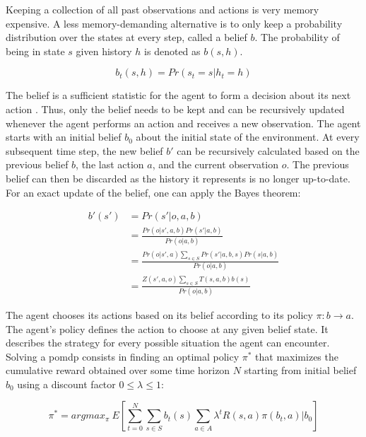 Keeping a collection of all past observations and actions is very memory expensive. A less memory-demanding alternative is to only keep a probability distribution over the states at every step, called a belief $b$. The probability of being in state $s$ given history $h$ is denoted as $b(s,h)$. 

\begin{equation}
    b_t(s,h) = Pr(s_t = s|h_t = h)
\end{equation}

The belief is a sufficient statistic for the agent to form a decision about its next action \parencite{pomdp-belief}. Thus, only the belief needs to be kept and can be recursively updated whenever the agent performs an action and receives a new observation. The agent starts with an initial belief $b_0$ about the initial state of the environment. At every subsequent time step, the new belief $b'$ can be recursively calculated based on the previous belief $b$, the last action $a$, and the current observation $o$. The previous belief can then be discarded as the history it represents is no longer up-to-date. For an exact update of the belief, one can apply the Bayes theorem:

\begin{equation}
    \label{eq:bayes_update}
    \begin{split}
        b'(s') & = Pr(s' | o, a , b) \\
               & = \frac{Pr(o | s', a, b)Pr(s' | a,b)}{Pr(o| a, b)} \\
               & = \frac{Pr(o | s', a)\sum_{s \in S}Pr(s' | a, b, s)Pr(s| a, b)}{Pr(o| a, b)} \\
               & = \frac{Z(s', a, o)\sum_{s \in S}T(s, a, b)b(s)}{Pr(o | a, b)}
    \end{split}
\end{equation}

\noindent
The agent chooses its actions based on its belief according to its policy $\pi: b \rightarrow a$. The agent's policy defines the action to choose at any given belief state. It describes the strategy for every possible situation the agent can encounter. Solving a \gls{pomdp} consists in finding an optimal policy $\pi^*$ that maximizes the cumulative reward obtained over some time horizon $N$ starting from initial belief $b_0$ using a discount factor $0 \leq \lambda \leq 1$:

\begin{equation}
    \pi^* = argmax_{\pi}~E\left[ \sum_{t=0}^{N} \sum_{s \in S}b_t(s) \sum_{a \in A} \lambda^t R(s,a) \pi(b_t,a) | b_0\right]
\end{equation}

